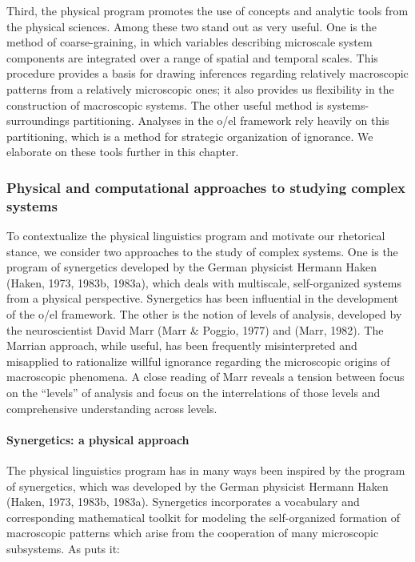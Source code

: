   Third, the physical program promotes the use of concepts and analytic tools from the physical sciences. Among these two stand out as very useful. One is the method of coarse-graining, in which variables describing microscale system components are integrated over a range of spatial and temporal scales. This procedure provides a basis for drawing inferences regarding relatively macroscopic patterns from a relatively microscopic ones; it also provides us flexibility in the construction of macroscopic systems. The other useful method is systems-surroundings partitioning. Analyses in the o/el framework rely heavily on this partitioning, which is a method for strategic organization of ignorance. We elaborate on these tools further in this chapter.

\subsubsection{Physical and computational approaches to studying complex systems}

To contextualize the physical linguistics program and motivate our rhetorical stance, we consider two approaches to the study of complex systems. One is the program of synergetics developed by the German physicist Hermann Haken (Haken, 1973, 1983b, 1983a), which deals with multiscale, self-organized systems from a physical perspective. Synergetics has been influential in the development of the o/el framework. The other is the notion of levels of analysis, developed by the neuroscientist David Marr (Marr \& Poggio, 1977) and (Marr, 1982). The Marrian approach, while useful, has been frequently misinterpreted and misapplied to rationalize willful ignorance regarding the microscopic origins of macroscopic phenomena. A close reading of Marr reveals a tension between focus on the “levels” of analysis and focus on the interrelations of those levels and comprehensive understanding across levels.

\paragraph{Synergetics: a physical approach}

The physical linguistics program has in many ways been inspired by the program of synergetics, which was developed by the German physicist Hermann Haken (Haken, 1973, 1983b, 1983a). Synergetics incorporates a vocabulary and corresponding mathematical toolkit for modeling the self-organized formation of macroscopic patterns which arise from the cooperation of many microscopic subsystems. As \citet{Haken1973} puts it:

